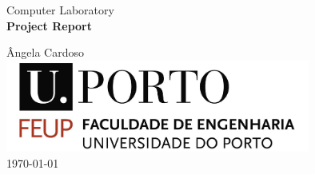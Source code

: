 

\begin{titlepage}
\begin{center}
 
\vspace*{3cm}

{\Large Computer Laboratory}\\[2cm]

{\Huge \bfseries Project Report \\[1cm]}

{\large \^Angela Cardoso}\\[2cm]

\includegraphics[width=10cm]{feup_logo.jpg}\\[2cm]


{\large \today}

\end{center}
\end{titlepage}